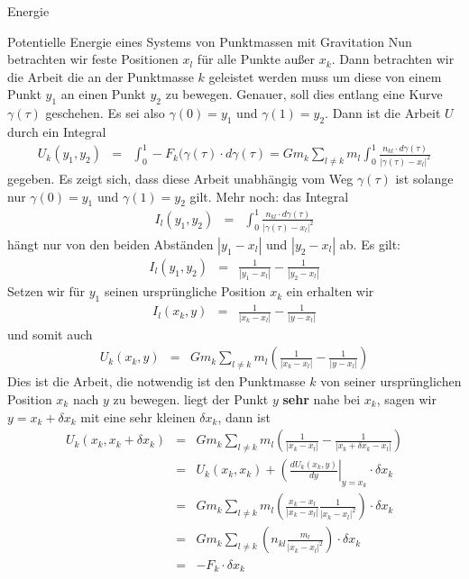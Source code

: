 \begin{chapter}{\titlestr}
\begin{section}{Energie}
\begin{subsection}{Potentielle Energie eines Systems von Punktmassen mit Gravitation}
Nun betrachten wir feste Positionen $x_l$ für alle Punkte außer $x_k$. Dann betrachten wir die Arbeit die an der Punktmasse $k$ geleistet werden muss um diese von einem  Punkt $y_1$ an einen Punkt $y_2$ zu bewegen. Genauer, soll dies entlang eine Kurve
$\gamma(\tau)$ geschehen. Es sei also $\gamma(0)=y_1$ und $\gamma(1)=y_2$. Dann ist die Arbeit $U$ durch ein Integral
\begin{eqnarray*}
U_k(y_1,y_2) &=& \int_0^1-F_k(\gamma(\tau)\cdot d \gamma(\tau)=Gm_k\sum_{l\ne k} m_l\int_0^1\frac{n_{kl}\cdot d \gamma(\tau)}{|\gamma(\tau)-x_l|^2}
\end{eqnarray*}
gegeben. Es zeigt sich, dass diese Arbeit unabhängig vom Weg $\gamma(\tau)$ ist solange nur $\gamma(0)=y_1$ und $\gamma(1)=y_2$
gilt. Mehr noch: das Integral
\begin{eqnarray*}
I_l(y_1,y_2) &=& \int_0^1\frac{n_{kl}\cdot d \gamma(\tau)}{|\gamma(\tau)-x_l|^2}
\end{eqnarray*}
hängt nur von den beiden Abständen $|y_1-x_l|$ und $|y_2-x_l|$ ab. Es gilt:
\begin{eqnarray*}
I_l(y_1,y_2) &=& \frac{1}{|y_1-x_l|}-\frac{1}{|y_2-x_l|}
\end{eqnarray*}
Setzen wir für $y_1$ seinen ursprüngliche Position $x_k$ ein erhalten wir
\begin{eqnarray*}
I_l(x_k,y) &=& \frac{1}{|x_k-x_l|}-\frac{1}{|y-x_l|}
\end{eqnarray*}
und somit auch
\begin{eqnarray*}
U_k(x_k,y) &=& Gm_k\sum_{l\ne k} m_l\left(\frac{1}{|x_k-x_l|}-\frac{1}{|y-x_l|}\right)
\end{eqnarray*}
Dies ist die Arbeit, die notwendig ist den Punktmasse $k$ von seiner ursprünglichen Position $x_k$ nach $y$ zu bewegen.
liegt der Punkt $y$ \textbf{sehr} nahe bei $x_k$, sagen wir $y=x_k+\delta x_k$ mit eine sehr kleinen $\delta x_k$, dann ist
\begin{eqnarray*}
U_k(x_k,x_k+\delta x_k) &=& Gm_k\sum_{l\ne k} m_l\left(\frac{1}{|x_k-x_l|}-\frac{1}{|x_k+\delta x_k-x_l|}\right)\\
&=& U_k(x_k,x_k)+\left(\frac{d U_k(x_k,y)}{dy}\right|_{y=x_k}\cdot \delta x_k\\
&=& Gm_k\sum_{l\ne k} m_l\left(\frac{x_k-x_l}{|x_k-x_l|}\frac{1}{|x_k-x_l|^2}\right)\cdot \delta x_k\\
&=& Gm_k\sum_{l\ne k} \left(n_{kl}\frac{m_l}{|x_k-x_l|^2}\right)\cdot \delta x_k\\
&=& -F_k\cdot \delta x_k
\end{eqnarray*}

\end{subsection}
\end{section}
\end{chapter}

